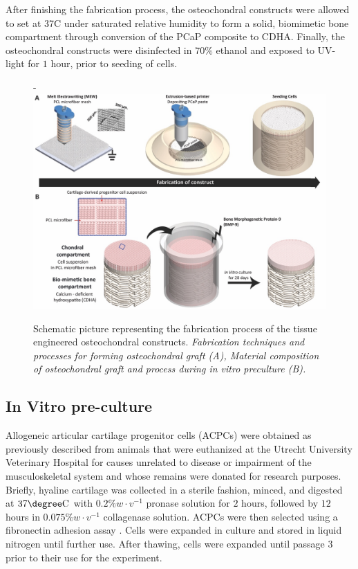 \documentclass[twocolumn, empirical, authordate, issue]{jote-new-article}
\begin{document}
After finishing the fabrication process, the osteochondral constructs were allowed to set at 37\degree C under saturated relative humidity to form a solid, biomimetic bone compartment through conversion of the PCaP composite to CDHA. Finally, the osteochondral constructs were disinfected in $70\%$ ethanol and exposed to UV-light for $1$ hour, prior to seeding of cells.

\begin{figure}[t!]
      \captionsetup{width=\dimexpr \linewidth + .8\fullwidthlen\relax}

\begin{adjustwidth}{-\fullwidthlen}{}
 \includegraphics[width=\linewidth]{media/image2.jpg}
\caption{Schematic picture representing the fabrication process of the tissue engineered osteochondral constructs. \emph{Fabrication techniques and processes for forming osteochondral graft (A), Material composition of osteochondral graft and process during in vitro preculture (B).}}
\label{fig:figure2}
\end{adjustwidth}
\end{figure}
\subsection{In Vitro pre-culture} 

Allogeneic articular cartilage progenitor cells (ACPCs) were obtained as previously described \parencite{Levato2017, Williams2010} from animals that were euthanized at the Utrecht University Veterinary Hospital for causes unrelated to disease or impairment of the musculoskeletal system and whose remains were donated for research purposes. Briefly, hyaline cartilage was collected in a sterile fashion, minced, and digested at $37\degree \text{C}$ with $0.2\% w\cdot v^{-1}$ pronase solution for $2$ hours, followed by $12$ hours in $0.075\%
w\cdot v^{-1}$ collagenase solution. ACPCs were then selected using a fibronectin adhesion assay \parencite{Levato2017}. Cells were expanded in culture and stored in liquid nitrogen until further use. After thawing, cells were expanded until passage 3 prior to their use for the experiment.
\end{document}

